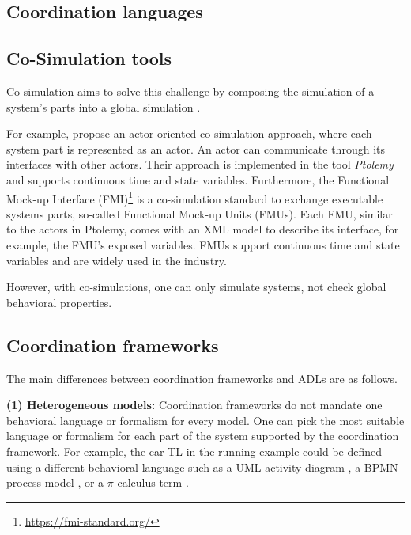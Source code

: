 \documentclass[runningheads]{llncs}
\begin{document}
\subsection{Coordination languages}
\cite{papadopoulosCoordinationModelsLanguages1998}

\subsection{Co-Simulation tools}
\cite{gomesCoSimulationSurvey2019} %

Co-simulation aims to solve this challenge by composing the simulation of a system's parts into a global simulation \cite{gomesCoSimulationSurvey2019}.

For example, \cite{ekerTamingHeterogeneityPtolemy2003} propose an actor-oriented co-simulation approach, where each system part is represented as an actor.
An actor can communicate through its interfaces with other actors.
Their approach is implemented in the tool \textit{Ptolemy} and supports continuous time and state variables.
Furthermore, the Functional Mock-up Interface (FMI)\footnote{\url{https://fmi-standard.org/}} is a co-simulation standard to exchange executable systems parts, so-called Functional Mock-up Units (FMUs).
Each FMU, similar to the actors in Ptolemy, comes with an XML model to describe its interface, for example, the FMU's exposed variables.
FMUs support continuous time and state variables and are widely used in the industry.

However, with co-simulations, one can only simulate systems, not check global behavioral properties.

\subsection{Coordination frameworks} \label{subsec:frameworks}

The main differences between coordination frameworks and ADLs are as follows.

\textbf{(1) Heterogeneous models:} Coordination frameworks do not mandate one behavioral language or formalism for every model.
One can pick the most suitable language or formalism for each part of the system supported by the coordination framework.
For example, the car TL in the running example could be defined using a different behavioral language such as a UML activity diagram \cite{objectmanagementgroupUnifiedModelingLanguage2017}, a BPMN process model \cite{objectmanagementgroupBusinessProcessModel2013}, or a $\pi$-calculus term \cite{milnerCommunicatingMobileSystems2010}.
\end{document}
